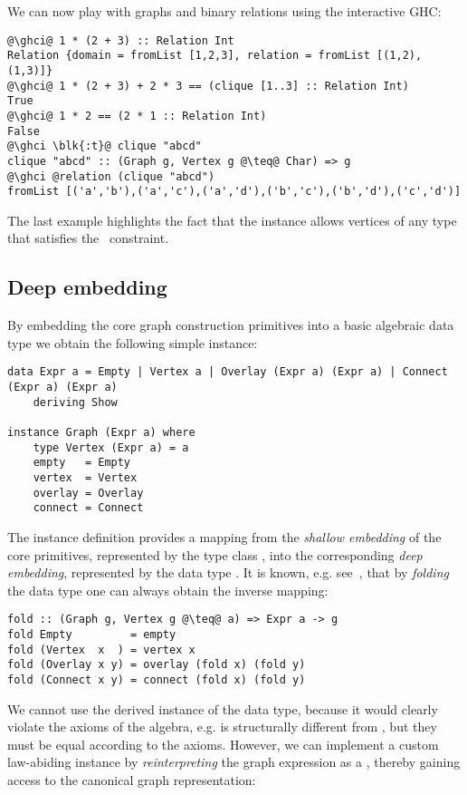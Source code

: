 We can now play with graphs and binary relations using the interactive GHC:

\begin{verbatim}
@\ghci@ 1 * (2 + 3) :: Relation Int
Relation {domain = fromList [1,2,3], relation = fromList [(1,2),(1,3)]}
@\ghci@ 1 * (2 + 3) + 2 * 3 == (clique [1..3] :: Relation Int)
True
@\ghci@ 1 * 2 == (2 * 1 :: Relation Int)
False
@\ghci \blk{:t}@ clique "abcd"
clique "abcd" :: (Graph g, Vertex g @\teq@ Char) => g
@\ghci @relation (clique "abcd")
fromList [('a','b'),('a','c'),('a','d'),('b','c'),('b','d'),('c','d')]
\end{verbatim}

\noindent
The last example highlights the fact that the  instance allows vertices
of any type  that satisfies the~ constraint.

\subsection{Deep embedding}\label{sub-embedding}

By embedding the core graph construction primitives into a basic algebraic data type
we obtain the following simple  instance:

\begin{verbatim}
data Expr a = Empty | Vertex a | Overlay (Expr a) (Expr a) | Connect (Expr a) (Expr a)
    deriving Show

instance Graph (Expr a) where
    type Vertex (Expr a) = a
    empty   = Empty
    vertex  = Vertex
    overlay = Overlay
    connect = Connect
\end{verbatim}

The instance definition provides a mapping from the \emph{shallow embedding}
of the core primitives, represented by the type class , into the
corresponding \emph{deep embedding}, represented by the data type .
It is known, e.g. see~\citet{2014_gibbons_folding}, that by \emph{folding} the data
type one can always obtain the inverse mapping:

\begin{verbatim}
fold :: (Graph g, Vertex g @\teq@ a) => Expr a -> g
fold Empty         = empty
fold (Vertex  x  ) = vertex x
fold (Overlay x y) = overlay (fold x) (fold y)
fold (Connect x y) = connect (fold x) (fold y)
\end{verbatim}

We cannot use the derived  instance of the  data type, because it
would clearly violate the axioms of the algebra, e.g.  is
structurally different from , but they must be equal according to the axioms.
However, we can implement a custom law-abiding 
instance by \emph{reinterpreting} the graph expression 
as a , thereby gaining access to the canonical graph representation:

